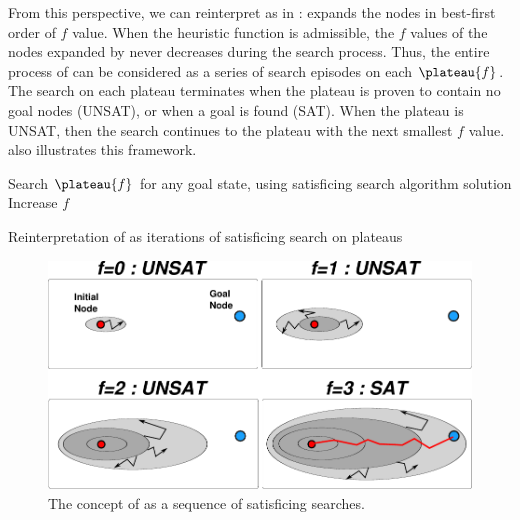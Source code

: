 From this perspective, we can reinterpret \astar as in : \astar expands the nodes in best-first order of $f$ value. When the
heuristic function is admissible, the $f$ values of the nodes expanded by \astar never decreases during the
search process.
Thus, the entire process of \astar can be considered as a series of search episodes on each $\plateau{f}$.
The search on each plateau terminates when the plateau is proven to contain no goal nodes (UNSAT), or when a goal is found (SAT).
When the plateau is UNSAT, then the search continues to the plateau with the next smallest $f$ value.
 also illustrates this framework.

\begin{algorithm}
 \begin{algorithmic}
  \LOOP
  \STATE Search $\plateau{f}$ for any goal state, using satisficing search algorithm
  \RETURN solution
  \ELSE
  \STATE Increase $f$ 
  \ENDIF
  \ENDLOOP
 \end{algorithmic}
 \caption{Reinterpretation of \astar as iterations of satisficing search on plateaus}
 \label{alg:astar-sat}
\end{algorithm}

\begin{figure}[htbp]
 \centering
 \includegraphics[width=0.8\linewidth]{img/astar/plateau-5.pdf}
 \caption{The concept of \astar as a sequence of satisficing searches.}
 \label{fig:astar-sat}
\end{figure}


